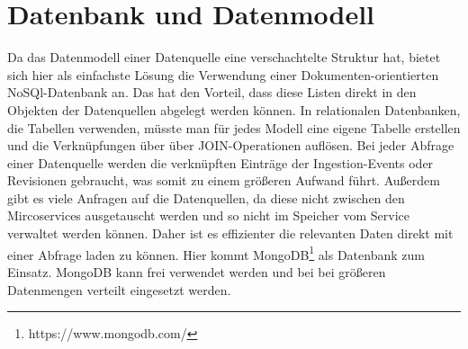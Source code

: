 \section{Datenbank und Datenmodell}

Da das Datenmodell einer Datenquelle eine verschachtelte Struktur hat, bietet sich hier als einfachste Lösung die Verwendung einer Dokumenten-orientierten NoSQl-Datenbank an.
Das hat den Vorteil, dass diese Listen direkt in den Objekten der Datenquellen abgelegt werden können.
In relationalen Datenbanken, die Tabellen verwenden, müsste man für jedes Modell eine eigene Tabelle erstellen und die Verknüpfungen über über JOIN-Operationen auflösen.
Bei jeder Abfrage einer Datenquelle werden die verknüpften Einträge der Ingestion-Events oder Revisionen gebraucht, was somit zu einem größeren Aufwand führt.
Außerdem gibt es viele Anfragen auf die Datenquellen, da diese nicht zwischen den Mircoservices ausgetauscht werden und so nicht im Speicher vom Service verwaltet werden können.
Daher ist es effizienter die relevanten Daten direkt mit einer Abfrage laden zu können.
Hier kommt MongoDB\footnote{https://www.mongodb.com/} als Datenbank zum Einsatz.
MongoDB kann frei verwendet werden und bei bei größeren Datenmengen verteilt eingesetzt werden.
